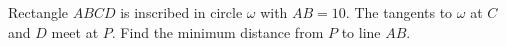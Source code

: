Rectangle $ABCD$ is inscribed in circle $\omega$ with $AB=10$. The tangents to $\omega$ at $C$ and $D$ meet at $P$. Find the minimum distance from $P$ to line $AB$.
